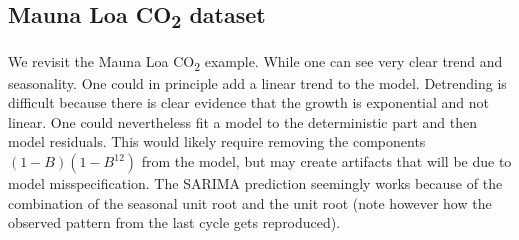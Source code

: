 \documentclass[]{book}
\newenvironment{Shaded}{\begin{snugshade}}{\end{snugshade}}
\newcommand{\CharTok}[1]{\textcolor[rgb]{0.31,0.60,0.02}{#1}}
\newcommand{\CommentTok}[1]{\textcolor[rgb]{0.56,0.35,0.01}{\textit{#1}}}
\newcommand{\DataTypeTok}[1]{\textcolor[rgb]{0.13,0.29,0.53}{#1}}
\newcommand{\DecValTok}[1]{\textcolor[rgb]{0.00,0.00,0.81}{#1}}
\newcommand{\KeywordTok}[1]{\textcolor[rgb]{0.13,0.29,0.53}{\textbf{#1}}}
\newcommand{\NormalTok}[1]{#1}
\newcommand{\OperatorTok}[1]{\textcolor[rgb]{0.81,0.36,0.00}{\textbf{#1}}}
\newcommand{\StringTok}[1]{\textcolor[rgb]{0.31,0.60,0.02}{#1}}
\begin{document}
\hypertarget{mauna-loa-co2-dataset}{%
\subsection{\texorpdfstring{Mauna Loa CO\textsubscript{2} dataset}{Mauna Loa CO2 dataset}}\label{mauna-loa-co2-dataset}}

We revisit the Mauna Loa CO\textsubscript{2} example. While one can see very clear trend and seasonality. One could in principle add a linear trend to the model. Detrending is difficult because there is clear evidence that the growth is exponential and not linear. One could nevertheless fit a model to the deterministic part and then model residuals. This would likely require removing the components \((1-B)(1-B^{12})\) from the model, but may create artifacts that will be due to model misspecification. The SARIMA prediction seemingly works because of the combination of the seasonal unit root and the unit root (note however how the observed pattern from the last cycle gets reproduced).

\begin{Shaded}
\end{Shaded}
\end{document}
